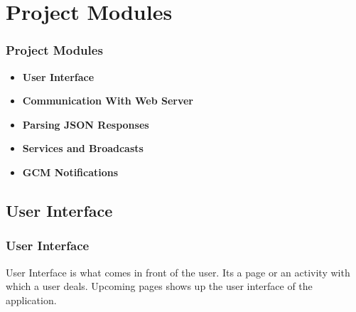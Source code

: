 \documentclass{beamer}   %
\begin{document}
\section{Project Modules}
\begin{frame}
\frametitle{Project Modules}
\begin{itemize}
\item \textbf{User Interface}\pause
\item \textbf{Communication With Web Server}\pause
\item \textbf{Parsing JSON Responses}\pause
\item \textbf{Services and Broadcasts}\pause
\item \textbf{GCM Notifications}\pause
\end{itemize}
\end{frame}

\subsection{User Interface}
\begin{frame}
\frametitle{User Interface}
User Interface is what comes in front of the user. Its a page or an activity with which a user deals.
Upcoming pages shows up the user interface of the application.
\end{frame}
\end{document}
